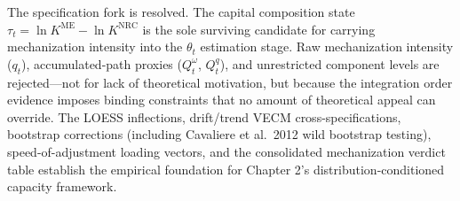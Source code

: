 \documentclass[11pt,a4paper]{article}
\begin{document}
The specification fork is resolved. The capital composition state $\tau_t = \ln K^{\text{ME}} - \ln K^{\text{NRC}}$ is the sole surviving candidate for carrying mechanization intensity into the $\theta_t$ estimation stage. Raw mechanization intensity ($q_t$), accumulated-path proxies ($Q_t^\omega$, $Q_t^q$), and unrestricted component levels are rejected---not for lack of theoretical motivation, but because the integration order evidence imposes binding constraints that no amount of theoretical appeal can override. The LOESS inflections, drift/trend VECM cross-specifications, bootstrap corrections (including Cavaliere et al.\ 2012 wild bootstrap testing), speed-of-adjustment loading vectors, and the consolidated mechanization verdict table establish the empirical foundation for Chapter 2's distribution-conditioned capacity framework.
\end{document}
